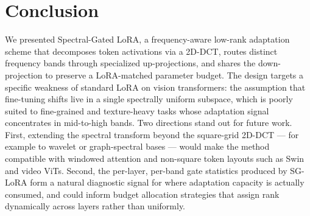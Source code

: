 \documentclass{article}
\begin{document}
\section{Conclusion}
We presented Spectral-Gated LoRA, a frequency-aware low-rank adaptation scheme that decomposes token activations via a 2D-DCT, routes distinct frequency bands through specialized up-projections, and shares the down-projection to preserve a LoRA-matched parameter budget. The design targets a specific weakness of standard LoRA on vision transformers: the assumption that fine-tuning shifts live in a single spectrally uniform subspace, which is poorly suited to fine-grained and texture-heavy tasks whose adaptation signal concentrates in mid-to-high bands. Two directions stand out for future work. First, extending the spectral transform beyond the square-grid 2D-DCT — for example to wavelet or graph-spectral bases — would make the method compatible with windowed attention and non-square token layouts such as Swin and video ViTs. Second, the per-layer, per-band gate statistics produced by SG-LoRA form a natural diagnostic signal for where adaptation capacity is actually consumed, and could inform budget allocation strategies that assign rank dynamically across layers rather than uniformly.



\end{document}
